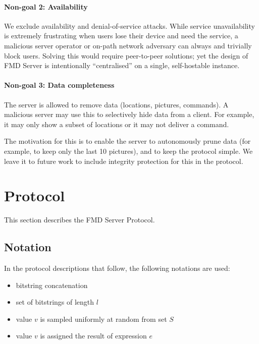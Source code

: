 \documentclass[11pt,a4paper]{article}
\begin{document}
\paragraph{Non-goal 2: Availability}
We exclude availability and denial-of-service attacks.
While service unavailability is extremely frustrating when users lose their device and need the service,
a malicious server operator or on-path network adversary can always and trivially block users.
Solving this would require peer-to-peer solutions; yet the design of FMD Server
is intentionally ``centralised'' on a single, self-hostable instance.

\paragraph{Non-goal 3: Data completeness}
The server is allowed to remove data (locations, pictures, commands).
A malicious server may use this to selectively hide data from a client.
For example, it may only show a subset of locations or it may not deliver a command.

The motivation for this is to enable the server to autonomously prune data
(for example, to keep only the last 10 pictures),
and to keep the protocol simple.
We leave it to future work to include integrity protection for this in the protocol.




\newpage

\section{Protocol}\label{sec:protocol}

This section describes the FMD Server Protocol.

\subsection{Notation}

In the protocol descriptions that follow, the following notations are used:

\begin{itemize}
    \item[$ || $] \quad bitstring concatenation
    \item[$ \bin^{l} $] \quad set of bitstrings of length $l$
    \item[$ v \sample S $] \quad value $v$ is sampled uniformly at random from set $S$
    \item[$ v \gets e $] \quad value $v$ is assigned the result of expression $e$
\end{itemize}
\end{document}
